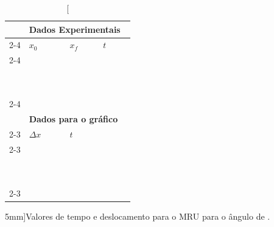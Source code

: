 \begin{table}[!ht]
\centering
\begin{tabular}{lp{25mm}p{25mm}p{25mm}l}
\toprule
	&\multicolumn{4}{l}{\textbf{Dados Experimentais}} \\
	\cmidrule{2-4}
	& $x_0$ & $x_f$ & $t$ &\\
	\cmidrule{2-4}
	& \cellcolor[gray]{0.89} & \cellcolor[gray]{0.92} & \cellcolor[gray]{0.89} \\
	& \cellcolor[gray]{0.95} & \cellcolor[gray]{0.97} & \cellcolor[gray]{0.95} \\
	& \cellcolor[gray]{0.89} & \cellcolor[gray]{0.92} & \cellcolor[gray]{0.89} \\
	& \cellcolor[gray]{0.95} & \cellcolor[gray]{0.97} & \cellcolor[gray]{0.95} \\
	& \cellcolor[gray]{0.89} & \cellcolor[gray]{0.92} & \cellcolor[gray]{0.89} \\
	& \cellcolor[gray]{0.95} & \cellcolor[gray]{0.97} & \cellcolor[gray]{0.95} \\
	& \cellcolor[gray]{0.89} & \cellcolor[gray]{0.92} & \cellcolor[gray]{0.89} \\
	& \cellcolor[gray]{0.95} & \cellcolor[gray]{0.97} & \cellcolor[gray]{0.95} \\
	& \cellcolor[gray]{0.89} & \cellcolor[gray]{0.92} & \cellcolor[gray]{0.89} \\
	& \cellcolor[gray]{0.95} & \cellcolor[gray]{0.97} & \cellcolor[gray]{0.95} \\
	\cmidrule{2-4}
\\
	& \multicolumn{3}{l}{\textbf{Dados para o gráfico}} \\
	\cmidrule{2-3}
	& $\Delta x$ & $t$ \\
	\cmidrule{2-3}
	& \cellcolor[gray]{0.89} & \cellcolor[gray]{0.92} \\ 
	& \cellcolor[gray]{0.95} & \cellcolor[gray]{0.97} \\ 
	& \cellcolor[gray]{0.89} & \cellcolor[gray]{0.92} \\ 
	& \cellcolor[gray]{0.95} & \cellcolor[gray]{0.97} \\ 
	& \cellcolor[gray]{0.89} & \cellcolor[gray]{0.92} \\ 
	& \cellcolor[gray]{0.95} & \cellcolor[gray]{0.97} \\ 
	& \cellcolor[gray]{0.89} & \cellcolor[gray]{0.92} \\ 
	& \cellcolor[gray]{0.95} & \cellcolor[gray]{0.97} \\ 
	& \cellcolor[gray]{0.89} & \cellcolor[gray]{0.92} \\ 
	& \cellcolor[gray]{0.95} & \cellcolor[gray]{0.97} \\ 
	\cmidrule{2-3}
\bottomrule
\end{tabular}
\caption[][5mm]{Valores de tempo e deslocamento para o MRU para o ângulo de .}
\label{DadosMRU}
\end{table}

